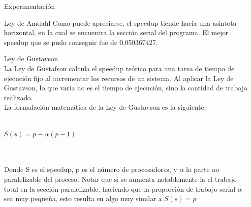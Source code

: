 \begin{section}{Experimentación}
\begin{subsection}{Ley de Amdahl}
Como puede apreciarse, el speedup tiende hacia una asintota horizontal, en la cual se encuentra la sección serial del programa. El mejor speedup que se pudo conseguir fue de 0.050367427.
\end{subsection}


\begin{subsection}{Ley de Gustavson}
~\\
La Ley de Gustafson calcula el speedup teórico para una tarea de tiempo de ejecución fijo al incrementar los recursos de un sistema. Al aplicar la Ley de Gustavson, lo que varia no es el tiempo de ejecución, sino la cantidad de trabajo realizado. 
~\\
La formulación matemática de la Ley de Gustavson es la siguiente:
~\\
~\\
\begin{center}
$S(s) = p - \alpha(p-1)$
\end{center}
~\\
~\\
Donde S es el speedup, p es el número de procesadores, y $\alpha$ la parte no paralelizable del proceso. Notar que si se aumenta notablemente la el trabajo total en la sección paralelizable, haciendo que la proporción de trabajo serial $\alpha$ sea muy pequeña, esto resulta en algo muy similar a $S(s) = p$



\end{subsection}
\end{section}

